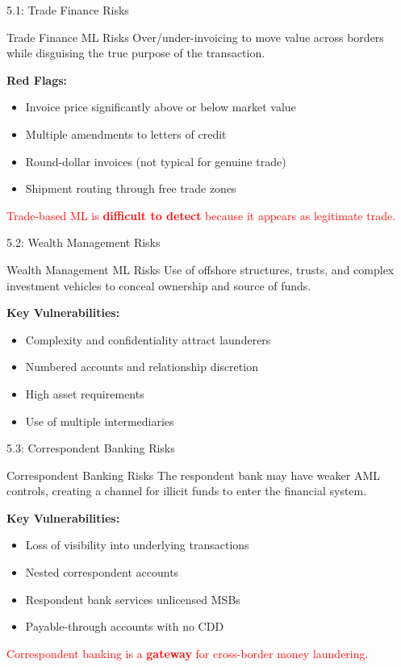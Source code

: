 \documentclass{beamer}
\begin{document}
	
	\begin{frame}{5.1: Trade Finance Risks}
		\begin{block}{Trade Finance ML Risks}
			Over/under-invoicing to move value across borders while disguising the true purpose of the transaction.
		\end{block}
		\textbf{Red Flags:}
		\begin{itemize}
			\item Invoice price significantly above or below market value
			\item Multiple amendments to letters of credit
			\item Round-dollar invoices (not typical for genuine trade)
			\item Shipment routing through free trade zones
		\end{itemize}
		\textcolor{red}{Trade-based ML is \textbf{difficult to detect} because it appears as legitimate trade.}
	\end{frame}
	
	\begin{frame}{5.2: Wealth Management Risks}
		\begin{block}{Wealth Management ML Risks}
			Use of offshore structures, trusts, and complex investment vehicles to conceal ownership and source of funds.
		\end{block}
		\textbf{Key Vulnerabilities:}
		\begin{itemize}
			\item Complexity and confidentiality attract launderers
			\item Numbered accounts and relationship discretion
			\item High asset requirements
			\item Use of multiple intermediaries
		\end{itemize}
	\end{frame}
	
	\begin{frame}{5.3: Correspondent Banking Risks}
		\begin{block}{Correspondent Banking Risks}
			The respondent bank may have weaker AML controls, creating a channel for illicit funds to enter the financial system.
		\end{block}
		\textbf{Key Vulnerabilities:}
		\begin{itemize}
			\item Loss of visibility into underlying transactions
			\item Nested correspondent accounts
			\item Respondent bank services unlicensed MSBs
			\item Payable-through accounts with no CDD
		\end{itemize}
		\textcolor{red}{Correspondent banking is a \textbf{gateway} for cross-border money laundering.}
	\end{frame}
	
\end{document}
